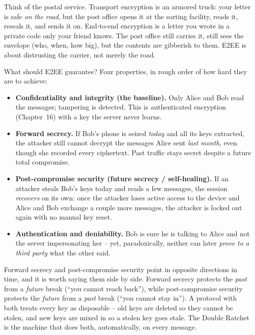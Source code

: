 \begin{intuitionbox}
Think of the postal service. Transport encryption is an armored truck: your letter is safe \emph{on the road}, but the post office opens it at the sorting facility, reads it, reseals it, and sends it on. End-to-end encryption is a letter you wrote in a private code only your friend knows. The post office still carries it, still sees the envelope (who, when, how big), but the contents are gibberish to them. E2EE is about distrusting the carrier, not merely the road.
\end{intuitionbox}

What should E2EE guarantee? Four properties, in rough order of how hard they are to achieve:

\begin{itemize}
  \item \textbf{Confidentiality and integrity (the baseline).} Only Alice and Bob read the messages; tampering is detected. This is authenticated encryption (Chapter~16) with a key the server never learns.
  \item \textbf{Forward secrecy.} If Bob's phone is seized \emph{today} and all its keys extracted, the attacker still cannot decrypt the messages Alice sent \emph{last month}, even though she recorded every ciphertext. Past traffic stays secret despite a future total compromise.
  \item \textbf{Post-compromise security (future secrecy / self-healing).} If an attacker steals Bob's keys today and reads a few messages, the session \emph{recovers} on its own: once the attacker loses active access to the device and Alice and Bob exchange a couple more messages, the attacker is locked out again with no manual key reset.
  \item \textbf{Authentication and deniability.} Bob is sure he is talking to Alice and not the server impersonating her -- yet, paradoxically, neither can later \emph{prove to a third party} what the other said.
\end{itemize}

\begin{focusbox}
Forward secrecy and post-compromise security point in opposite directions in time, and it is worth saying them side by side. Forward secrecy protects the \emph{past} from a \emph{future} break (``you cannot reach back''), while post-compromise security protects the \emph{future} from a \emph{past} break (``you cannot stay in''). A protocol with both treats every key as disposable -- old keys are deleted so they cannot be stolen, and new keys are mixed in so a stolen key goes stale. The Double Ratchet is the machine that does both, automatically, on every message.
\end{focusbox}

